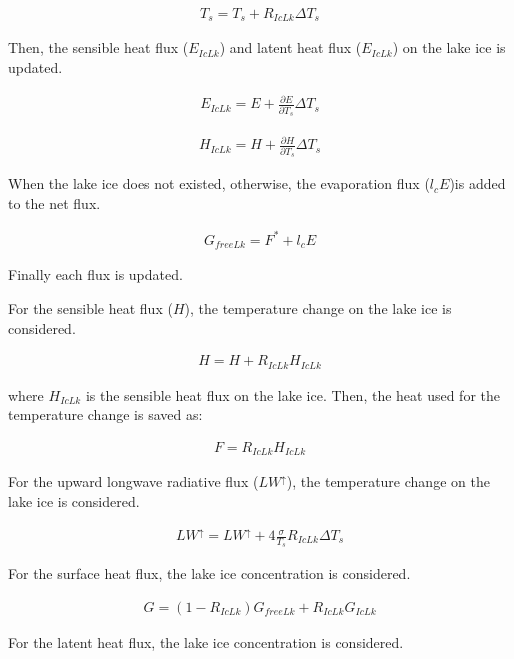 \begin{eqnarray}
    T_s = T_s +R_{IcLk} \Delta T_s
\end{eqnarray}

Then, the sensible heat flux (\(E_{IcLk}\)) and latent heat flux (\(E_{IcLk}\)) on the lake ice is updated.

\begin{eqnarray}
    E_{IcLk} = E + \frac{\partial E}{\partial T_s}\Delta T_s
\end{eqnarray}

\begin{eqnarray}
    H_{IcLk} = H + \frac{\partial H}{\partial T_s}\Delta T_s
\end{eqnarray}

When the lake ice does not existed, otherwise, the evaporation flux (\(l_cE\))is added to the net flux.

\begin{eqnarray}
    G_{freeLk}=F^\ast + l_cE
\end{eqnarray}

Finally each flux is updated.

For the sensible heat flux (\(H\)), the temperature change on the lake ice is considered.

\begin{eqnarray}
    H=H+ R_{IcLk}  H_{IcLk}
\end{eqnarray}

where \(H_{IcLk}\) is the sensible heat flux on the lake ice. Then, the heat used for the temperature change is saved as:

\begin{eqnarray}
    F = R_{IcLk} H_{IcLk}
\end{eqnarray}

For the upward longwave radiative flux (\(LW^\uparrow\)), the temperature change on the lake ice is considered.

\begin{eqnarray}
    LW^\uparrow=LW^\uparrow +  4\frac{\sigma}{T_s}R_{IcLk}  \Delta T_s
\end{eqnarray}

For the surface heat flux, the lake ice concentration is considered.

\begin{eqnarray}
    G=(1-R_{IcLk})G_{freeLk} + R_{IcLk}G_{IcLk}
\end{eqnarray}

For the latent heat flux, the lake ice concentration is considered.

